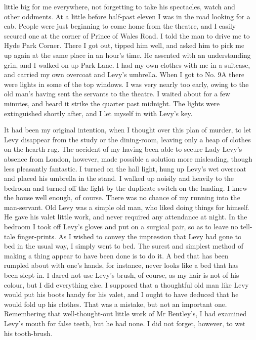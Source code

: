little big for me everywhere, not forgetting to take his spectacles, watch and other oddments. At a little before half-past eleven I was in the road looking for a cab. People were just beginning to come home from the theatre, and I easily secured one at the corner of Prince of Wales Road. I told the man to drive me to Hyde Park Corner. There I got out, tipped him well, and asked him to pick me up again at the same place in an hour’s time. He assented with an understanding grin, and I walked on up Park Lane. I had my own clothes with me in a suitcase, and carried my own overcoat and Levy’s umbrella. When I got to No. 9A there were lights in some of the top windows. I was very nearly too early, owing to the old man’s having sent the servants to the theatre. I waited about for a few minutes, and heard it strike the quarter past midnight. The lights were extinguished shortly after, and I let myself in with Levy’s key.

It had been my original intention, when I thought over this plan of murder, to let Levy disappear from the study or the dining-room, leaving only a heap of clothes on the hearth-rug. The accident of my having been able to secure Lady Levy’s absence from London, however, made possible a solution more misleading, though less pleasantly fantastic. I turned on the hall light, hung up Levy’s wet overcoat and placed his umbrella in the stand. I walked up noisily and heavily to the bedroom and turned off the light by the duplicate switch on the landing. I knew the house well enough, of course. There was no chance of my running into the man-servant. Old Levy was a simple old man, who liked doing things for himself. He gave his valet little work, and never required any attendance at night. In the bedroom I took off Levy’s gloves and put on a surgical pair, so as to leave no tell-tale finger-prints. As I wished to convey the impression that Levy had gone to bed in the usual way, I simply went to bed. The surest and simplest method of making a thing appear to have been done is to do it. A bed that has been rumpled about with one’s hands, for instance, never looks like a bed that has been slept in. I dared not use Levy’s brush, of course, as my hair is not of his colour, but I did everything else. I supposed that a thoughtful old man like Levy would put his boots handy for his valet, and I ought to have deduced that he would fold up his clothes. That was a mistake, but not an important one. Remembering that well-thought-out little work of Mr Bentley’s, I had examined Levy’s mouth for false teeth, but he had none. I did not forget, however, to wet his tooth-brush.

